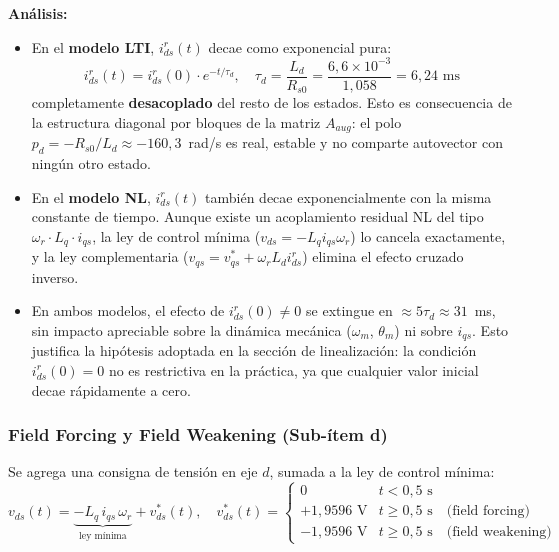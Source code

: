 \documentclass[12pt, a4paper,journal, onecolumn, compsoc]{IEEEtran}
\begin{document}
\textbf{Análisis:}
\begin{itemize}
    \item En el \textbf{modelo LTI}, $i_{ds}^r(t)$ decae como exponencial pura:
    \begin{equation}
        i_{ds}^r(t) = i_{ds}^r(0) \cdot e^{-t/\tau_d}, \quad \tau_d = \frac{L_d}{R_{s0}} = \frac{6{,}6 \times 10^{-3}}{1{,}058} = 6{,}24 \text{ ms}
    \end{equation}
    completamente \textbf{desacoplado} del resto de los estados. Esto es consecuencia de la estructura diagonal por bloques de la matriz $A_{aug}$: el polo $p_d = -R_{s0}/L_d \approx -160{,}3$~rad/s es real, estable y no comparte autovector con ningún otro estado.

    \item En el \textbf{modelo NL}, $i_{ds}^r(t)$ también decae exponencialmente con la misma constante de tiempo. Aunque existe un acoplamiento residual NL del tipo $\omega_r \cdot L_q \cdot i_{qs}$, la ley de control mínima ($v_{ds} = -L_q i_{qs} \omega_r$) lo cancela exactamente, y la ley complementaria ($v_{qs} = v_{qs}^* + \omega_r L_d i_{ds}^r$) elimina el efecto cruzado inverso.

    \item En ambos modelos, el efecto de $i_{ds}^r(0) \neq 0$ se extingue en $\approx 5\tau_d \approx 31$~ms, sin impacto apreciable sobre la dinámica mecánica ($\omega_m$, $\theta_m$) ni sobre $i_{qs}$. Esto justifica la hipótesis adoptada en la sección de linealización: la condición $i_{ds}^r(0) = 0$ no es restrictiva en la práctica, ya que cualquier valor inicial decae rápidamente a cero.
\end{itemize}

\subsubsection{Field Forcing y Field Weakening (Sub-ítem d)}
\label{sec:sim_item_d}

Se agrega una consigna de tensión en eje $d$, sumada a la ley de control mínima:
\begin{equation}
    v_{ds}(t) = \underbrace{-L_q \, i_{qs} \, \omega_r}_{\text{ley mínima}} + v_{ds}^*(t), \quad
    v_{ds}^*(t) = \begin{cases}
    0 & t < 0{,}5 \text{ s} \\
    +1{,}9596 \text{ V} & t \geq 0{,}5 \text{ s} \quad \text{(field forcing)}\\
    -1{,}9596 \text{ V} & t \geq 0{,}5 \text{ s} \quad \text{(field weakening)}
    \end{cases}
\end{equation}
\end{document}

